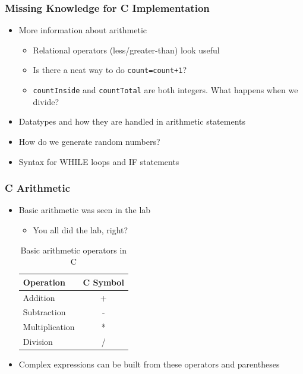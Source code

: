 \documentclass[14pt]{beamer}
\begin{document}
\begin{frame}
\frametitle{Missing Knowledge for C Implementation}
\begin{itemize}
\item More information about arithmetic
\begin{itemize}
	\item Relational operators (less/greater-than) look useful
	\item Is there a neat way to do \texttt{count=count+1}?
	\item \texttt{countInside} and \texttt{countTotal} are both integers. What happens when we divide?
\end{itemize}
\item Datatypes and how they are handled in arithmetic statements
\item How do we generate random numbers?
\item Syntax for WHILE loops and IF statements
\end{itemize}
\end{frame}

\begin{frame}
\frametitle{C Arithmetic}
\begin{itemize}
\item Basic arithmetic was seen in the lab
\begin{itemize}
\item You all did the lab, right?
\end{itemize}
\begin{table}[H]
\centering
\begin{tabular}{|l|c|}
\hline
Operation      & C Symbol \\
\hline
Addition       & +        \\
Subtraction    & -        \\
Multiplication & *        \\
Division       & /       \\
\hline
\end{tabular}
\caption{Basic arithmetic operators in C}
\end{table}
\item Complex expressions can be built from these operators and parentheses
\end{itemize}
\end{frame}
\end{document}
